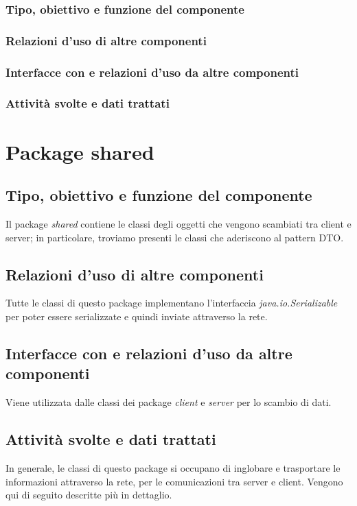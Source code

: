 \subsubsection*{Tipo, obiettivo e funzione del componente}
\subsubsection*{Relazioni d'uso di altre componenti}
\subsubsection*{Interfacce con e relazioni d'uso da altre componenti}
\subsubsection*{Attivit\`a svolte e dati trattati}

\newpage
\section{Package shared} %
\subsection*{Tipo, obiettivo e funzione del componente}
Il package \textit{shared} contiene le classi degli oggetti che vengono
scambiati tra client e server; in particolare, troviamo presenti le classi che
aderiscono al pattern DTO.
\subsection*{Relazioni d'uso di altre componenti}
Tutte le classi di questo package implementano l'interfaccia
\textit{java.io.Serializable} per poter essere serializzate e quindi inviate
attraverso la rete. 
\subsection*{Interfacce con e relazioni d'uso da altre componenti}
Viene utilizzata dalle classi dei package \textit{client} e \textit{server} per
lo scambio di dati.
\subsection*{Attivit\`a svolte e dati trattati}
In generale, le classi di questo package si occupano di inglobare e trasportare
le informazioni attraverso la rete, per le comunicazioni tra server e client.
Vengono qui di seguito descritte pi\`u in dettaglio.

